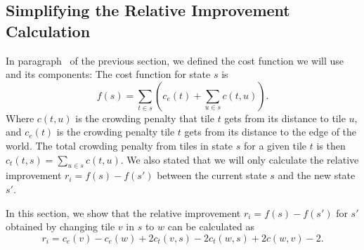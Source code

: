 \subsection{Simplifying the Relative Improvement Calculation}\label{sec:analysis-proof-improvement}

In paragraph~ of the previous section, we defined the cost function we will use and its components:
The cost function for state $s$ is
\begin{equation*}
    f(s) = \sum_{t \in s} \left(c_e(t) + \sum_{u \in s} c(t,u) \right).
\end{equation*}
Where $c(t,u)$ is the crowding penalty that tile $t$ gets from its distance to tile $u$, and $c_e(t)$ is the crowding penalty tile $t$ gets from its distance to the edge of the world.
The total crowding penalty from tiles in state $s$ for a given tile $t$ is then $c_t(t,s) = \sum_{u \in s} c(t,u)$.
We also stated that we will only calculate the relative improvement $r_i = f(s) - f(s')$ between the current state $s$ and the new state $s'$.

In this section, we show that the relative improvement $r_i = f(s) - f(s')$ for $s'$ obtained by changing tile $v$ in $s$ to $w$ can be calculated as
\begin{equation*}
    r_i = c_e(v) - c_e(w)  + 2 c_t(v,s) - 2 c_t(w,s) + 2c(w,v) - 2.
\end{equation*}

